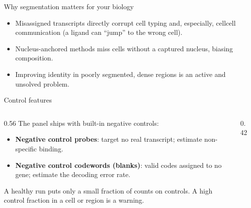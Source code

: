 \documentclass[aspectratio=169]{beamer}
\begin{document}
\begin{frame}{Why segmentation matters for your biology}
  \begin{itemize}
    \item Misassigned transcripts directly corrupt cell typing and, especially,
      cell\textendash cell communication (a ligand can ``jump'' to the wrong cell).
    \item Nucleus-anchored methods miss cells without a captured nucleus, biasing
      composition.
    \item Improving identity in poorly segmented, dense regions is an active and
      unsolved problem.
  \end{itemize}
\end{frame}

\begin{frame}{Control features}
  \begin{columns}[T]
  \begin{column}{0.56\textwidth}
  The panel ships with built-in negative controls:
  \begin{itemize}
    \item \textbf{Negative control probes}: target no real transcript; estimate
      non-specific binding.
    \item \textbf{Negative control codewords (blanks)}: valid codes assigned to no
      gene; estimate the decoding error rate.
  \end{itemize}
  A healthy run puts only a small fraction of counts on controls. A high control
  fraction in a cell or region is a warning.
  \end{column}
  \begin{column}{0.42\textwidth}
  \centering
  \end{column}
  \end{columns}
\end{frame}
\end{document}

